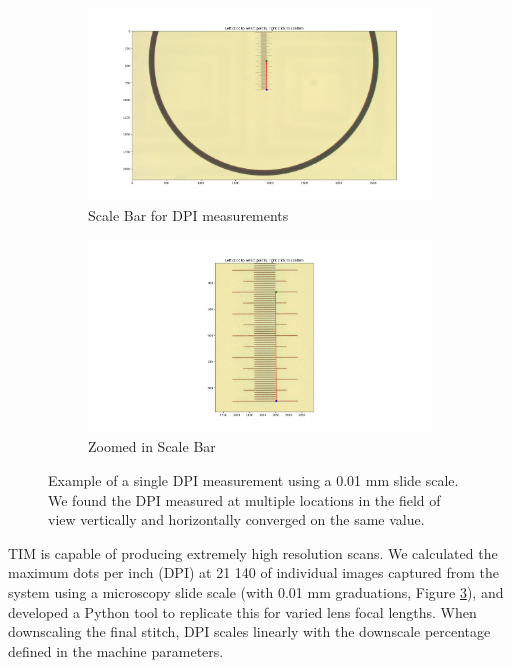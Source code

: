 \documentclass[a4paper,12pt]{article}
\begin{document}
\begin{figure}
  \centering
  \begin{subfigure}{.5\textwidth}
    \centering
    \includegraphics[height=0.5\linewidth]{../diagrams/dpi_measurement_whole.png}
    \caption{Scale Bar for DPI measurements}
    \label{fig:dpi_measurement_whole}
  \end{subfigure}%
  \begin{subfigure}{.5\textwidth}
    \centering
    \includegraphics[height=0.5\linewidth]{../diagrams/dpi_measurement_zoomed_2.png}
    \caption{Zoomed in Scale Bar}
    \label{fig:dpi_measurement_zoomed}
  \end{subfigure}
  \caption{Example of a single DPI measurement using a 0.01 mm slide scale. We found the DPI measured at multiple locations in the field of view vertically and horizontally  converged on the same value.}
  \label{fig:dpi_measurements}
\end{figure}

TIM is capable of producing extremely high resolution scans. We calculated the maximum dots per inch (DPI) at 21 140 of individual images captured from the system using a microscopy slide scale (with 0.01 mm graduations, Figure \ref{fig:dpi_measurements}), and developed a Python tool to replicate this for varied lens focal lengths. When downscaling the final stitch, 
DPI scales linearly with the downscale percentage defined in the machine parameters. 
\end{document}

